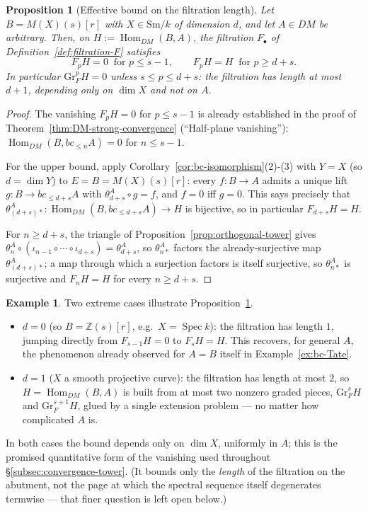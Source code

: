 \documentclass[12pt,a4paper]{article}
\newtheorem{proposition}[theorem]{Proposition}
\theoremstyle{definition}
\newtheorem{example}[theorem]{Example}
\newcommand{\Sm}{\mathrm{Sm}}
\newcommand{\Hom}{\operatorname{Hom}}
\newcommand{\Gr}{\mathrm{Gr}}
\newcommand{\Z}{\mathbb{Z}}
\begin{document}
\begin{proposition}[Effective bound on the filtration length]
\label{prop:effective-bound}
Let $B=M(X)(s)[r]$ with $X\in\Sm/k$ of dimension $d$, and let $A\in DM$ be
arbitrary.  Then, on $H:=\Hom_{DM}(B,A)$, the filtration $F_\bullet$ of
Definition~\ref{def:filtration-F} satisfies
\[
  F_pH = 0 \ \text{ for } p\leq s-1,
  \qquad
  F_pH = H \ \text{ for } p\geq d+s.
\]
In particular $\Gr_F^pH=0$ unless $s\leq p\leq d+s$: the filtration has length
at most $d+1$, depending only on $\dim X$ and not on $A$.
\end{proposition}
\begin{proof}
The vanishing $F_pH=0$ for $p\leq s-1$ is already established in the proof of
Theorem~\ref{thm:DM-strong-convergence} (``Half-plane vanishing''):
$\Hom_{DM}(B,bc_{\leq n}A)=0$ for $n\leq s-1$.

For the upper bound, apply Corollary~\ref{cor:bc-isomorphism}(2)-(3) with
$Y=X$ (so $d=\dim Y$) to $E=B=M(X)(s)[r]$: every $f:B\to A$ admits a unique
lift $g:B\to bc_{\leq d+s}A$ with $\theta_{d+s}^A\circ g=f$, and $f=0$ iff
$g=0$.  This says precisely that
$\theta_{(d+s)\ast}^A:\Hom_{DM}(B,bc_{\leq d+s}A)\to H$ is bijective, so in
particular $F_{d+s}H=H$.

For $n\geq d+s$, the triangle of Proposition~\ref{prop:orthogonal-tower}
gives $\theta_n^A\circ(\iota_{n-1}\circ\cdots\circ\iota_{d+s})=\theta_{d+s}^A$,
so $\theta_{n\ast}^A$ factors the already-surjective map
$\theta_{(d+s)\ast}^A$; a map through which a surjection factors is itself
surjective, so $\theta_{n\ast}^A$ is surjective and $F_nH=H$ for every
$n\geq d+s$.
\end{proof}

\begin{example}
Two extreme cases illustrate Proposition~\ref{prop:effective-bound}.
\begin{itemize}
\item $d=0$ (so $B=\Z(s)[r]$, e.g.\ $X=\operatorname{Spec}k$): the filtration
  has length $1$, jumping directly from $F_{s-1}H=0$ to $F_sH=H$.  This
  recovers, for general $A$, the phenomenon already observed for $A=B$ itself
  in Example~\ref{ex:bc-Tate}.
\item $d=1$ ($X$ a smooth projective curve): the filtration has length at
  most $2$, so $H=\Hom_{DM}(B,A)$ is built from at most two nonzero graded
  pieces, $\Gr_F^sH$ and $\Gr_F^{s+1}H$, glued by a single extension problem
  — no matter how complicated $A$ is.
\end{itemize}
In both cases the bound depends only on $\dim X$, uniformly in $A$; this is
the promised quantitative form of the vanishing used throughout
\S\ref{subsec:convergence-tower}.  (It bounds only the \emph{length} of the
filtration on the abutment, not the page at which the spectral sequence
itself degenerates termwise — that finer question is left open below.)
\end{example}
\end{document}
